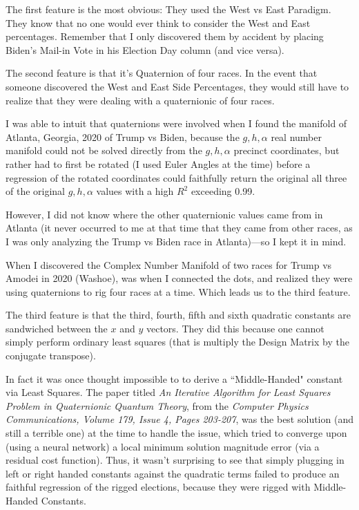 The first feature is the most obvious: They used the West vs East Paradigm. They know that no one would ever think to consider the West and East percentages. Remember that I only discovered them by accident by placing Biden's Mail-in Vote in his Election Day column (and vice versa).

The second feature is that it's Quaternion of four races. In the event that someone discovered the West and East Side Percentages, they would still have to realize that they were dealing with a quaternionic of four races.

I was able to intuit that quaternions were involved when I found the manifold of Atlanta, Georgia, 2020 of Trump vs Biden, because the $g,h,\alpha$ real number manifold could not be solved directly from the $g,h,\alpha$ precinct coordinates, but rather had to first be rotated (I used Euler Angles at the time) before a regression of the rotated coordinates could faithfully return the original all three of the original $g,h,\alpha$ values with a high $R^2$ exceeding 0.99.

However, I did not know where the other quaternionic values came from in Atlanta (it never occurred to me at that time that they came from other races, as I was only analyzing the Trump vs Biden race in Atlanta)---so I kept it in mind.

When I discovered the Complex Number Manifold of two races for Trump vs Amodei in 2020 (Washoe), was when I connected the dots, and realized they were using quaternions to rig four races at a time. Which leads us to the third feature.

The third feature is that the third, fourth, fifth and sixth quadratic constants are sandwiched between the $x$ and $y$ vectors. They did this because one cannot simply perform ordinary least squares (that is multiply the Design Matrix by the conjugate transpose). 

In fact it was once thought impossible to to derive a ``Middle-Handed" constant via Least Squares. The paper titled \textit{An Iterative Algorithm for Least Squares Problem in Quaternionic Quantum Theory}, from the \textit{Computer Physics Communications, Volume 179, Issue 4, Pages 203-207}, was the best solution (and still a terrible one) at the time to handle the issue, which tried to converge upon (using a neural network) a local minimum solution magnitude error (via a residual cost function).
\newpage
Thus, it wasn't surprising to see that simply plugging in left or right handed constants against the quadratic terms failed to produce an faithful regression of the rigged elections, because they were rigged with Middle-Handed Constants. 

